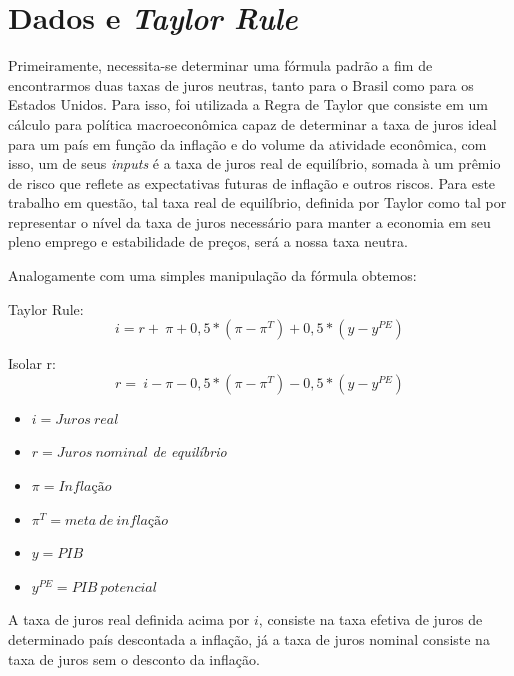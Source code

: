 \section*{Dados e \textit{Taylor Rule} }

 Primeiramente, necessita-se determinar uma f\'{o}rmula padr\~{a}o a fim de encontrarmos duas taxas de juros neutras, tanto para o Brasil como para os Estados Unidos. Para isso, foi utilizada a Regra de Taylor que consiste em um c\'{a}lculo para pol\'{i}tica macroecon\^{o}mica capaz de determinar a taxa de juros ideal para um pa\'{i}s em fun\c{c}\~{a}o da infla\c{c}\~{a}o e do volume da atividade econ\^{o}mica, com isso, um de seus \textit{inputs} \'{e} a taxa de juros real de equil\'{i}brio, somada \`{a} um pr\^{e}mio de risco que reflete as expectativas futuras de infla\c{c}\~{a}o e outros riscos. Para este trabalho em quest\~{a}o, tal taxa real de equil\'{i}brio, definida por Taylor como tal por representar o n\'{i}vel da taxa de juros necess\'{a}rio para manter a economia em seu pleno emprego e estabilidade de pre\c{c}os, ser\'{a} a nossa taxa neutra. 

 Analogamente com uma simples manipula\c{c}\~{a}o da f\'{o}rmula obtemos: 

Taylor Rule: 
\[i=r+~\pi +0,5*\left(\pi -{\pi }^T\right)+0,5*\left(y-y^{PE}\right)\] 

Isolar r: 
\[r=~i-\pi -0,5*\left(\pi -{\pi }^T\right)-0,5*\left(y-y^{PE}\right)\] 


\begin{itemize}
\item  $i=Juros~real$

\item  $r=Juros~nominal$\textit{ de equil\'{i}brio }

\item  $\pi =Infla\textrm{\c{c}}\textrm{\~{a}}o$

\item  ${\pi }^T=meta~de~infla\textrm{\c{c}}\textrm{\~{a}}o~$

\item  $y=PIB$

\item  $y^{PE}=PIB~potencial$
\end{itemize}

A taxa de juros real definida acima por $i$, consiste na taxa efetiva de juros de determinado pa\'{i}s descontada a infla\c{c}\~{a}o, j\'{a} a taxa de juros nominal consiste na taxa de juros sem o desconto da infla\c{c}\~{a}o. 

